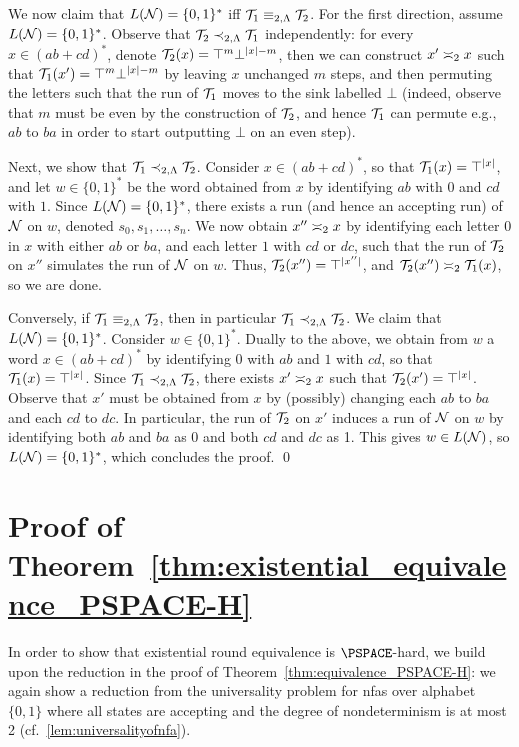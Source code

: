 We now claim that $L(\cN)=\{0,1\}^*$ iff $\cT_1\equiv_{2,\fL}\cT_2$.
For the first direction, assume $L(\cN)=\{0,1\}^*$. Observe that $\cT_2\prec_{2,\fL}\cT_1$ independently: for every $x\in (ab+cd)^*$, denote $\cT_2(x)=\top^{m}\bot^{|x|-m}$, then we can construct $x'\req[2]x$ such that $\cT_1(x')=\top^{m}\bot^{|x|-m}$ by leaving $x$ unchanged $m$ steps, and then permuting the letters such that the run of $\cT_1$ moves to the sink labelled $\bot$ (indeed, observe that $m$ must be even by the construction of $\cT_2$, and hence $\cT_1$ can permute e.g., $ab$ to $ba$ in order to start outputting $\bot$ on an even step).

Next, we show that $\cT_1\prec_{2,\fL}\cT_2$. Consider $x\in (ab+cd)^*$, so that $\cT_1(x)=\top^{|x|}$, and let $w\in \{0,1\}^*$ be the word obtained from $x$ by identifying $ab$ with $0$ and $cd$ with $1$. Since $L(\cN)=\{0,1\}^*$, there exists a run (and hence an accepting run) of $\cN$ on $w$, denoted $s_0,s_1,\ldots,s_n$. We now obtain $x''\req[2]x$ by identifying each letter $0$ in $x$ with either $ab$ or $ba$, and each letter $1$ with $cd$ or $dc$, such that the run of $\cT_2$ on $x''$ simulates the run of $\cN$ on $w$. Thus, $\cT_2(x'')=\top^{|x''|}$, and $\cT_2(x'')\req[2]\cT_1(x)$, so we are done.

Conversely, if $\cT_1\equiv_{2,\fL}\cT_2$, then in particular $\cT_1\prec_{2,\fL}\cT_2$. We claim that $L(\cN)=\{0,1\}^*$. Consider $w\in \{0,1\}^*$. Dually to the above, we obtain from $w$ a word $x\in (ab+cd)^*$ by identifying $0$ with $ab$ and $1$ with $cd$, so that $\cT_1(x)=\top^{|x|}$. 
Since $\cT_1\prec_{2,\fL}\cT_2$, there exists $x'\req[2]x$ such that $\cT_2(x')=\top^{|x|}$. Observe that $x'$ must be obtained from $x$ by (possibly) changing each $ab$ to $ba$ and each $cd$ to $dc$. In particular, the run of $\cT_2$ on $x'$ induces a run of $\cN$ on $w$ by identifying both $ab$ and $ba$ as 0 and both $cd$ and $dc$ as 1. This gives $w\in L(\cN)$, so $L(\cN)=\{0,1\}^*$, which concludes the proof. \qed

\section{Proof of Theorem~\ref{thm:existential_equivalence_PSPACE-H}}
\label{apx:proof_existential_PSPACE-H}

In order to show that existential round equivalence is $\PSPACE$-hard, we build upon the reduction in the proof of Theorem~\ref{thm:equivalence_PSPACE-H}: we again show a reduction from the universality problem for \glspl{nfa} over alphabet $\{0,1\}$ where all states are accepting and the degree of nondeterminism is at most 2 (cf.~\cref{lem:universalityofnfa}).

